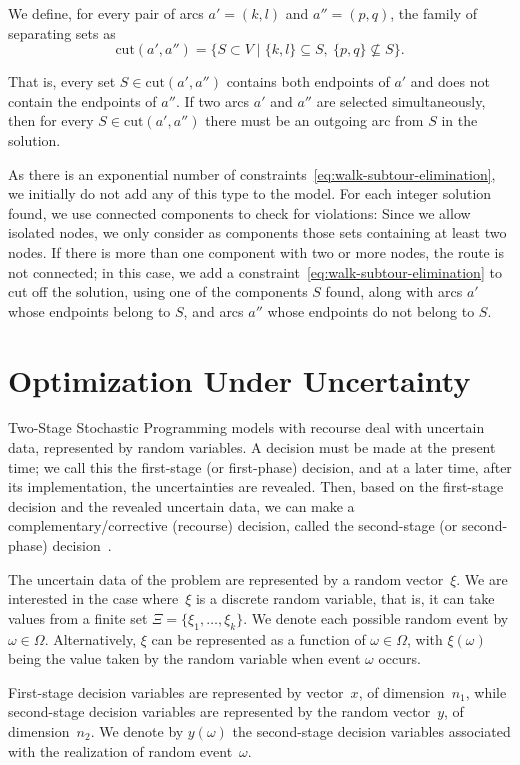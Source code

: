 We define, for every pair of arcs $a' = (k, l)$ and $a'' = (p, q)$, the family
of separating sets as
\[
	\mathrm{cut}(a', a'') = \{ S \subset V \mid \{k, l\} \subseteq S, \ \{p, q\} \nsubseteq S \}.
\]

That is, every set $S \in \mathrm{cut}(a', a'')$ contains both endpoints of $a'$
and does not contain the endpoints of $a''$. If two arcs $a'$ and $a''$ are
selected simultaneously, then for every $S \in \mathrm{cut}(a', a'')$ there must
be an outgoing arc from $S$ in the solution.

As there is an exponential number of
constraints~\eqref{eq:walk-subtour-elimination}, we initially do not add any of
this type to the model. For each integer solution found, we use connected
components to check for violations: Since we allow isolated nodes, we only
consider as components those sets containing at least two nodes. If there is
more than one component with two or more nodes, the route is not connected; in
this case, we add a constraint~\eqref{eq:walk-subtour-elimination} to cut off
the solution, using one of the components $S$ found, along with arcs $a'$ whose
endpoints belong to $S$, and arcs $a''$ whose endpoints do not belong to $S$.


\section{Optimization Under Uncertainty}\label{sec:optimization-under-uncertainty}

Two-Stage Stochastic Programming models with recourse deal with uncertain data,
represented by random variables. A decision must be made at the present time; we
call this the first-stage (or first-phase) decision, and at a later time, after
its implementation, the uncertainties are revealed. Then, based on the
first-stage decision and the revealed uncertain data, we can make a
complementary/corrective (recourse) decision, called the second-stage (or
second-phase) decision~\cite{birge:2011}.

The uncertain data of the problem are represented by a random vector~$\xi$. We
are interested in the case where~$\xi$ is a discrete random variable, that is,
it can take values from a finite set $\Xi = \{\xi_{1}, \ldots, \xi_{k}\}$. We
denote each possible random event by $\omega \in \Omega$. Alternatively, $\xi$
can be represented as a function of $\omega \in \Omega$, with $\xi(\omega)$
being the value taken by the random variable when event $\omega$ occurs.

First-stage decision variables are represented by vector~$x$, of
dimension~$n_{1}$, while second-stage decision variables are represented by the
random vector~$y$, of dimension~$n_{2}$. We denote by $y(\omega)$ the
second-stage decision variables associated with the realization of random
event~$\omega$.

